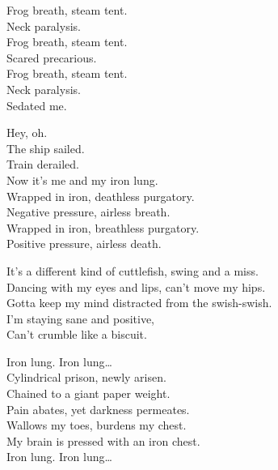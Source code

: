 Frog breath, steam tent. \\
Neck paralysis. \\
Frog breath, steam tent. \\
Scared precarious. \\
Frog breath, steam tent. \\
Neck paralysis. \\
Sedated me. \\


Hey, oh. \\
The ship sailed. \\
Train derailed. \\
Now it's me and my iron lung. \\

Wrapped in iron, deathless purgatory. \\
Negative pressure, airless breath. \\
Wrapped in iron, breathless purgatory. \\
Positive pressure, airless death. \\


It's a different kind of cuttlefish, swing and a miss. \\
Dancing with my eyes and lips, can't move my hips. \\
Gotta keep my mind distracted from the swish-swish. \\
I'm staying sane and positive, \\
Can't crumble like a biscuit. \\


Iron lung. Iron lung… \\

Cylindrical prison, newly arisen. \\
Chained to a giant paper weight. \\
Pain abates, yet darkness permeates. \\
Wallows my toes, burdens my chest. \\
My brain is pressed with an iron chest. \\

Iron lung. Iron lung… \\



